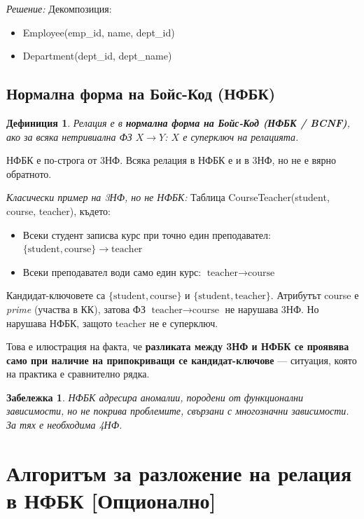 \documentclass{scrartcl}
\newtheorem{definition}{Дефиниция}
\newtheorem{remark}{Забележка}
\begin{document}
\begin{FlushLeft}
\textit{Решение:} Декомпозиция:
\begin{itemize}
    \item Employee(emp\_id, name, dept\_id)
    \item Department(dept\_id, dept\_name)
\end{itemize}

\subsection{Нормална форма на Бойс-Код (НФБК)}

\begin{definition}
Релация е в \textbf{\textit{нормална форма на Бойс-Код (НФБК / BCNF)}}, ако за всяка нетривиална ФЗ $X \rightarrow Y$: $X$ е суперключ на релацията.
\end{definition}

НФБК е по-строга от 3НФ. Всяка релация в НФБК е и в 3НФ, но не е вярно обратното.

\textit{Класически пример на 3НФ, но не НФБК:} Таблица CourseTeacher(student, course, teacher), където:
\begin{itemize}
    \item Всеки студент записва курс при точно един преподавател: $\{\text{student}, \text{course}\} \rightarrow \text{teacher}$
    \item Всеки преподавател води само един курс: $\text{teacher} \rightarrow \text{course}$
\end{itemize}
Кандидат-ключовете са $\{\text{student}, \text{course}\}$ и $\{\text{student}, \text{teacher}\}$. Атрибутът course е \emph{prime} (участва в КК), затова ФЗ $\text{teacher} \rightarrow \text{course}$ не нарушава 3НФ. Но нарушава НФБК, защото teacher не е суперключ.

Това е илюстрация на факта, че \textbf{разликата между 3НФ и НФБК се проявява само при наличие на припокриващи се кандидат-ключове} --- ситуация, която на практика е сравнително рядка.

\begin{remark}
НФБК адресира аномалии, породени от функционални зависимости, но не покрива проблемите, свързани с многозначни зависимости. За тях е необходима 4НФ.
\end{remark}

\section{Алгоритъм за разложение на релация в НФБК [Опционално]}


\end{FlushLeft}
\end{document}
